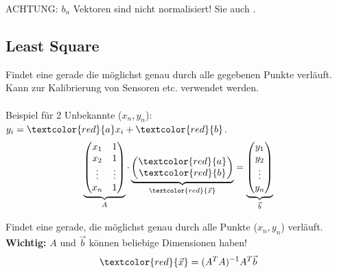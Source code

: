\noindent ACHTUNG: $b_n$ Vektoren sind nicht normalisiert! Sie auch .

\subsection{Least Square}\label{leastsquare}
Findet eine gerade die möglichst genau durch alle gegebenen Punkte verläuft. Kann zur Kalibrierung von Sensoren etc. verwendet werden. \\ \\
\noindent
Beispiel für 2 Unbekannte ($x_n, y_n$): $y_i = \textcolor{red}{a}x_i + \textcolor{red}{b}$.
\[
	\underbrace{\begin{pmatrix}
			x_1 & 1 \\
			x_2 & 1 \\
			\vdots & \vdots \\
			x_n & 1
		\end{pmatrix}}_{\scriptsize{A}}
	\cdot
	\underbrace{\begin{pmatrix}
			\textcolor{red}{a} \\
			\textcolor{red}{b}
		\end{pmatrix}}_{\scriptsize{\textcolor{red}{\vec{x}}}}
	=
	\underbrace{\begin{pmatrix}
		y_1 \\
		y_2 \\
		\vdots \\
		y_n
	\end{pmatrix}}_{\scriptsize{\vec{b}}}
\]

\noindent
Findet eine gerade, die möglichst genau durch alle Punkte ($x_n, y_n$) verläuft. \textbf{Wichtig:} $A$ und $\vec{b}$ können beliebige Dimensionen haben!
\[\textcolor{red}{\vec{x}} = (A^TA)^{-1}A^T\vec{b}\]
